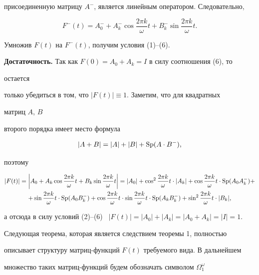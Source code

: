 присоединенную матрицу $A^-$, является линейным оператором. Следовательно, 


$$ 


F^-(t)=A^-_0+A^-_k\cos\frac{2\pi k}{\omega}t+ 


B^-_k\sin\frac{2\pi k}{\omega}t. 


$$ 


Умножив $F(t)$ на $F^-(t)$, получим условия (1)--(6). 


\medskip 


 


{\bf Достаточность.} Так как $F(0)=A_0+A_k=I$ в силу соотношения (6), то 


остается 


только убедиться в том, что $|F(t)|\equiv1$. Заметим, что для квадратных 


матриц $A$, $B$ 


второго порядка имеет место формула 


$$ 


|A+B|=|A|+|B|+\SP(A\cdot B^-), 


$$ 


поэтому 


\begin{gather*} 


|F(t)|=\bigg|A_0+A_k\cos\frac{2\pi k}{\omega}t+ 


B_k\sin\frac{2\pi k}{\omega}t\bigg|=|A_0|+\cos^2\frac{2\pi k}{\omega}t 


\cdot |A_k|+\cos\frac{2\pi k}{\omega}t\cdot \SP(A_0A^-_k)+ \\ 


% 


+\sin\frac{2\pi k}{\omega}t\cdot \SP(A_0B^-_k)+ 


\cos \frac{2\pi k}{\omega}t\cdot \sin\frac{2\pi k}{\omega}t\cdot 


\SP(A_kB^-_k)+\sin^2\frac{2\pi k}{\omega}t\cdot |B_k|, 


\end{gather*} 


а отсюда в силу условий (2)--(6) \ $|F(t)|=|A_0|+|A_k|=|A_0+A_k|=|I|=1$. 


 


Следующая теорема, которая является следствием теоремы 1, полностью 


описывает структуру матриц-функций $F(t)$ требуемого вида. В дальнейшем 


множество таких матриц-функций будем обозначать символом $\Omega^\omega_1$ 


